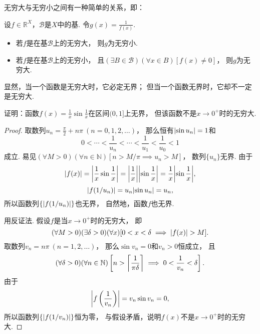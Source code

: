 无穷大与无穷小之间有一种简单的关系，即：
\begin{theorem}\label{theorem:极限.无穷大与无穷小的关系}
设\(f\in\mathbb{R}^X\)，\(\mathcal{B}\)是\(X\)中的基.
令\(g(x) = \frac1{f(x)}\).
\begin{itemize}
	\item 若\(f\)是在基\(\mathcal{B}\)上的无穷大，
	则\(g\)为无穷小.

	\item 若\(f\)是在基\(\mathcal{B}\)上的无穷小，
	且\((\exists B\in\mathcal{B})(\forall x\in B)[f(x) \neq 0]\)，
	则\(g\)为无穷大.
\end{itemize}
\end{theorem}

显然，当一个函数是无穷大时，它必定无界；
但当一个函数无界时，它却不一定是无穷大.
\begin{example}
证明：函数\(f(x) = \frac1x \sin\frac1x\)在区间\((0,1]\)上无界，
但该函数不是\(x\to0^+\)时的无穷大.
\begin{proof}
取数列\(u_n = \frac{\pi}{2} + n\pi\ (n=0,1,2,\dotsc)\)，
那么恒有\(\abs{\sin u_n} = 1\)和\[
	0 < \dotsb < \frac1{u_n} < \dotsb < \frac1{u_1} < \frac1{u_0} < 1
\]成立.
易见\((\forall M > 0)(\forall n\in\mathbb{N})[n > M/\pi \implies u_n > M]\)，
数列\(\{u_n\}\)无界.
由于\[
	\abs{f(x)} = \abs{\frac1x \sin\frac1x}
	= \abs{\frac1x} \abs{\sin\frac1x}
	= \frac1x \abs{\sin\frac1x},
\]\[
	\abs{f(1/u_n)}
	= u_n \abs{\sin u_n}
	= u_n,
\]
所以函数列\(\{\abs{f(1/u_n)}\}\)也无界，
自然地，函数\(f\)也无界.

用反证法.
假设\(f\)是当\(x\to0^+\)时的无穷大，
即\[
	(\forall M>0)
	(\exists\delta>0)
	(\forall x)
	[
		0<x<\delta
		\implies
		\abs{f(x)}>M
	].
\]
取数列\(v_n = n\pi\ (n=1,2,\dotsc)\)，
那么\(\sin v_n = 0\)和\(v_n>0\)恒成立，
且\[
	(\forall\delta>0)
	(\forall n\in\mathbb{N})
	\left[n>\ceil*{\frac1{\pi\delta}} \implies 0<\frac1{v_n}<\delta\right].
\]
由于\[
	\abs{f\left(\frac1{v_n}\right)}
	= v_n \sin v_n
	= 0,
\]
所以函数列\(\{\abs{f(1/v_n)}\}\)恒为零，
与假设矛盾，说明\(f(x)\)不是\(x\to0^+\)时的无穷大.
\end{proof}
\end{example}


